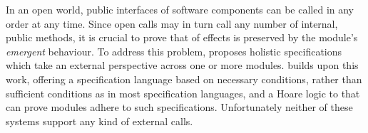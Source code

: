 In an open world, public interfaces of software components can be
called in any order at any time. 
Since open calls may in turn call any number of internal, public
methods, it is crucial to prove that \taming of effects is preserved
by the module's \emph{emergent} behaviour.
%
%
%
%
%
%
%
%
To address this problem, 
\citet{FASE}  proposes holistic specifications which take an external
perspective across one or more modules.
\citet{OOPSLA22} builds upon this work, offering a specification
language based on necessary conditions, rather than sufficient
conditions as in most specification languages, and a Hoare logic to 
that can prove modules  adhere to such specifications. Unfortunately
neither of these systems support any kind of external calls.


